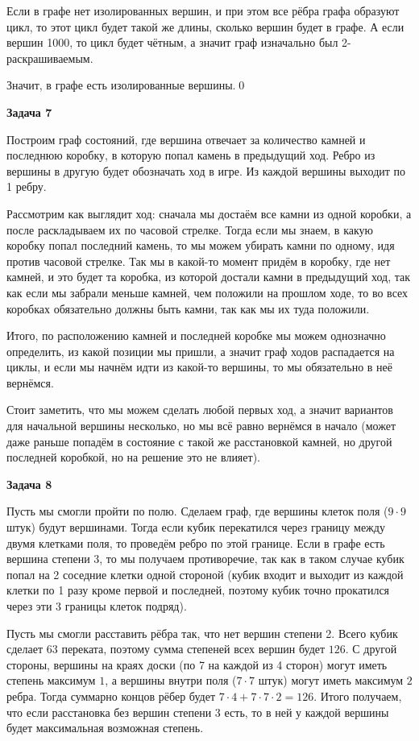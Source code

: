 Если в графе нет изолированных вершин, и при этом все рёбра графа образуют цикл, то этот цикл будет такой же длины, сколько вершин будет в графе. А если вершин 1000, то цикл будет чётным, а значит граф изначально был 2-раскрашиваемым.

Значит, в графе есть изолированные вершины.\qed 

\begin{center}
\textbf{Задача 7}
\end{center}
Построим граф состояний, где вершина отвечает за количество камней и последнюю коробку, в которую попал камень в предыдущий ход. Ребро из вершины в другую будет обозначать ход в игре. Из каждой вершины выходит по 1 ребру.

Рассмотрим как выглядит ход: сначала мы достаём все камни из одной коробки, а после раскладываем их по часовой стрелке. Тогда если мы знаем, в какую коробку попал последний камень, то мы можем убирать камни по одному, идя против часовой стрелке. Так мы в какой-то момент придём в коробку, где нет камней, и это будет та коробка, из которой достали камни в предыдущий ход, так как если мы забрали меньше камней, чем положили на прошлом ходе, то во всех коробках обязательно должны быть камни, так как мы их туда положили.

Итого, по расположению камней и последней коробке мы можем однозначно определить, из какой позиции мы пришли, а значит граф ходов распадается на циклы, и если мы начнём идти из какой-то вершины, то мы обязательно в неё вернёмся.

Стоит заметить, что мы можем сделать любой первых ход, а значит вариантов для начальной вершины несколько, но мы всё равно вернёмся в начало (может даже раньше попадём в состояние с такой же расстановкой камней, но другой последней коробкой, но на решение это не влияет).

\begin{center}
\textbf{Задача 8}
\end{center}
Пусть мы смогли пройти по полю. Сделаем граф, где вершины клеток поля ($\displaystyle 9\cdotp 9$ штук) будут вершинами. Тогда если кубик перекатился через границу между двумя клетками поля, то проведём ребро по этой границе. Если в графе есть вершина степени 3, то мы получаем противоречие, так как в таком случае кубик попал на 2 соседние клетки одной стороной (кубик входит и выходит из каждой клетки по 1 разу кроме первой и последней, поэтому кубик точно прокатился через эти 3 границы клеток подряд).

Пусть мы смогли расставить рёбра так, что нет вершин степени 2. Всего кубик сделает $\displaystyle 63$ переката, поэтому сумма степеней всех вершин будет $\displaystyle 126$. С другой стороны, вершины на краях доски (по 7 на каждой из 4 сторон) могут иметь степень максимум $\displaystyle 1$, а вершины внутри поля ($\displaystyle 7\cdotp 7$ штук) могут иметь максимум $\displaystyle 2$ ребра. Тогда суммарно концов рёбер будет $\displaystyle 7\cdotp 4+7\cdotp 7\cdotp 2=126$. Итого получаем, что если расстановка без вершин степени 3 есть, то в ней у каждой вершины будет максимальная возможная степень.

